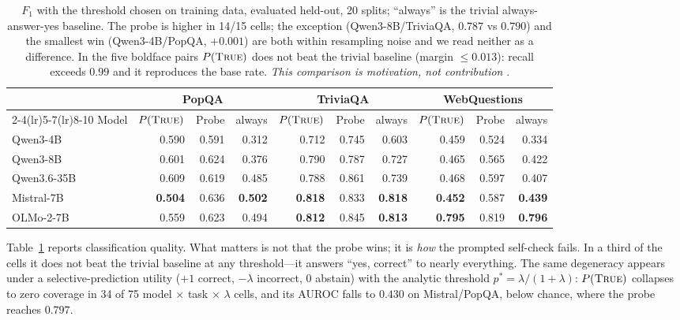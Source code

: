 \documentclass[10pt]{article}
\newcommand{\ptrue}{P(\textsc{True})}
\begin{document}
\begin{table}[t]
\centering\footnotesize
\setlength{\tabcolsep}{4.5pt}
\begin{tabular}{lrrrrrrrrr}
\toprule
& \multicolumn{3}{c}{PopQA} & \multicolumn{3}{c}{TriviaQA} & \multicolumn{3}{c}{WebQuestions} \\
\cmidrule(lr){2-4}\cmidrule(lr){5-7}\cmidrule(lr){8-10}
Model & $\ptrue{}$ & Probe & always & $\ptrue{}$ & Probe & always & $\ptrue{}$ & Probe & always \\
\midrule
Qwen3-4B    & 0.590 & 0.591 & 0.312 & 0.712 & 0.745 & 0.603 & 0.459 & 0.524 & 0.334 \\
Qwen3-8B    & 0.601 & 0.624 & 0.376 & 0.790 & 0.787 & 0.727 & 0.465 & 0.565 & 0.422 \\
Qwen3.6-35B & 0.609 & 0.619 & 0.485 & 0.788 & 0.861 & 0.739 & 0.468 & 0.597 & 0.407 \\
Mistral-7B  & \textbf{0.504} & 0.636 & \textbf{0.502} & \textbf{0.818} & 0.833 & \textbf{0.818} & \textbf{0.452} & 0.587 & \textbf{0.439} \\
OLMo-2-7B   & 0.559 & 0.623 & 0.494 & \textbf{0.812} & 0.845 & \textbf{0.813} & \textbf{0.795} & 0.819 & \textbf{0.796} \\
\bottomrule
\end{tabular}
\caption{$F_1$ with the threshold chosen on training data, evaluated held-out, 20 splits;
``always'' is the trivial always-answer-yes baseline. The probe is higher in 14/15 cells; the
exception (Qwen3-8B/TriviaQA, $0.787$ vs $0.790$) and the smallest win (Qwen3-4B/PopQA, $+0.001$)
are both within resampling noise and we read neither as a difference. In the five boldface pairs
$\ptrue{}$ does not beat the trivial baseline (margin $\le 0.013$): recall exceeds $0.99$ and it
reproduces the base rate. \emph{This comparison is motivation, not contribution}
\citep{azaria2023internal,orgad2024llms}.}
\label{tab:f1}
\end{table}

Table~\ref{tab:f1} reports classification quality. What matters is not that the probe wins; it is
\emph{how} the prompted self-check fails. In a third of the cells it does not beat the trivial
baseline at any threshold---it answers ``yes, correct'' to nearly everything. The same degeneracy
appears under a selective-prediction utility ($+1$ correct, $-\lambda$ incorrect, $0$ abstain) with
the analytic threshold $p^\ast = \lambda/(1{+}\lambda)$: $\ptrue{}$ collapses to zero coverage in
34 of 75 model $\times$ task $\times$ $\lambda$ cells, and its AUROC falls to $0.430$ on
Mistral/PopQA, below chance, where the probe reaches $0.797$.
\end{document}
